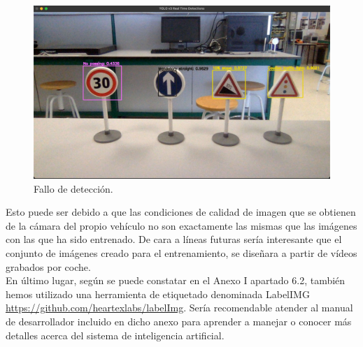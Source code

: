 \begin{figure}[H]
    \centering
 	\includegraphics[width=\textwidth]{Imagenes/IA/ejemplo_fallo.pdf}
    \caption{Fallo de detección.}
    \label{fallo}
\end{figure}

Esto puede ser debido a que las condiciones de calidad de imagen que se obtienen de la cámara del propio vehículo no son exactamente las mismas que las imágenes con las que ha sido entrenado. De cara a líneas futuras sería interesante que el conjunto de imágenes creado para el entrenamiento, se diseñara a partir de vídeos grabados por coche.\\

En último lugar, según se puede constatar en el Anexo I apartado 6.2, también hemos utilizado una herramienta de etiquetado denominada LabelIMG \url{https://github.com/heartexlabs/labelImg}. Sería recomendable atender al manual de desarrollador incluido en dicho anexo para aprender a manejar o conocer más detalles acerca del sistema de inteligencia artificial.


